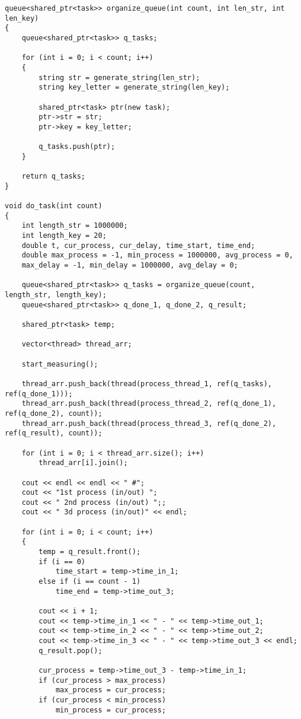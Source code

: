 \begin{lstlisting}[label=code4, caption = Работа с конвейером]
queue<shared_ptr<task>> organize_queue(int count, int len_str, int len_key)
{
	queue<shared_ptr<task>> q_tasks;
	
	for (int i = 0; i < count; i++)
	{
		string str = generate_string(len_str);
		string key_letter = generate_string(len_key);
		
		shared_ptr<task> ptr(new task);
		ptr->str = str;
		ptr->key = key_letter;
		
		q_tasks.push(ptr);
	}
	
	return q_tasks;
}

void do_task(int count)
{
	int length_str = 1000000;
	int length_key = 20;
	double t, cur_process, cur_delay, time_start, time_end;
	double max_process = -1, min_process = 1000000, avg_process = 0,
	max_delay = -1, min_delay = 1000000, avg_delay = 0;
	
	queue<shared_ptr<task>> q_tasks = organize_queue(count, length_str, length_key);
	queue<shared_ptr<task>> q_done_1, q_done_2, q_result;
	
	shared_ptr<task> temp;
	
	vector<thread> thread_arr;
	
	start_measuring();
	
	thread_arr.push_back(thread(process_thread_1, ref(q_tasks), ref(q_done_1)));
	thread_arr.push_back(thread(process_thread_2, ref(q_done_1), ref(q_done_2), count));
	thread_arr.push_back(thread(process_thread_3, ref(q_done_2), ref(q_result), count));
	
	for (int i = 0; i < thread_arr.size(); i++)
		thread_arr[i].join();
	
	cout << endl << endl << " #";
	cout << "1st process (in/out) ";
	cout << " 2nd process (in/out) ";;
	cout << " 3d process (in/out)" << endl;
	
	for (int i = 0; i < count; i++)
	{
		temp = q_result.front();
		if (i == 0)
			time_start = temp->time_in_1;
		else if (i == count - 1)
			time_end = temp->time_out_3;
		
		cout << i + 1;
		cout << temp->time_in_1 << " - " << temp->time_out_1;
		cout << temp->time_in_2 << " - " << temp->time_out_2; 
		cout << temp->time_in_3 << " - " << temp->time_out_3 << endl;
		q_result.pop();
		
		cur_process = temp->time_out_3 - temp->time_in_1;
		if (cur_process > max_process)
			max_process = cur_process;
		if (cur_process < min_process)
			min_process = cur_process;
		

\end{lstlisting}
